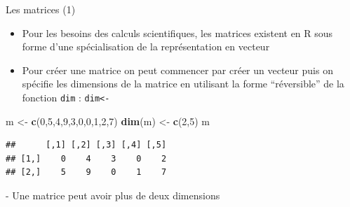 \documentclass[
  ignorenonframetext,
]{beamer}
\newenvironment{Shaded}{\begin{snugshade}}{\end{snugshade}}
\newcommand{\DecValTok}[1]{\textcolor[rgb]{0.00,0.00,0.81}{#1}}
\newcommand{\FunctionTok}[1]{\textcolor[rgb]{0.13,0.29,0.53}{\textbf{#1}}}
\newcommand{\NormalTok}[1]{#1}
\newcommand{\OtherTok}[1]{\textcolor[rgb]{0.56,0.35,0.01}{#1}}
\providecommand{\tightlist}{%
  \setlength{\itemsep}{0pt}\setlength{\parskip}{0pt}}
\begin{document}
\begin{frame}[fragile]{Les matrices (1)}
\protect\hypertarget{les-matrices-1}{}
\begin{itemize}
\tightlist
\item
  Pour les besoins des calculs scientifiques, les matrices existent en R
  sous forme d'une spécialisation de la représentation en vecteur
\item
  Pour créer une matrice on peut commencer par créer un vecteur puis on
  spécifie les dimensions de la matrice en utilisant la forme
  ``réversible'' de la fonction \texttt{dim} : \texttt{dim\textless{}-}
\end{itemize}

\tiny

\begin{Shaded}
\begin{Highlighting}[]
\NormalTok{m }\OtherTok{\textless{}{-}} \FunctionTok{c}\NormalTok{(}\DecValTok{0}\NormalTok{,}\DecValTok{5}\NormalTok{,}\DecValTok{4}\NormalTok{,}\DecValTok{9}\NormalTok{,}\DecValTok{3}\NormalTok{,}\DecValTok{0}\NormalTok{,}\DecValTok{0}\NormalTok{,}\DecValTok{1}\NormalTok{,}\DecValTok{2}\NormalTok{,}\DecValTok{7}\NormalTok{)}
\FunctionTok{dim}\NormalTok{(m) }\OtherTok{\textless{}{-}} \FunctionTok{c}\NormalTok{(}\DecValTok{2}\NormalTok{,}\DecValTok{5}\NormalTok{)}
\NormalTok{m}
\end{Highlighting}
\end{Shaded}

\begin{verbatim}
##      [,1] [,2] [,3] [,4] [,5]
## [1,]    0    4    3    0    2
## [2,]    5    9    0    1    7
\end{verbatim}

\normalsize - Une matrice peut avoir plus de deux dimensions
\end{frame}
\end{document}
